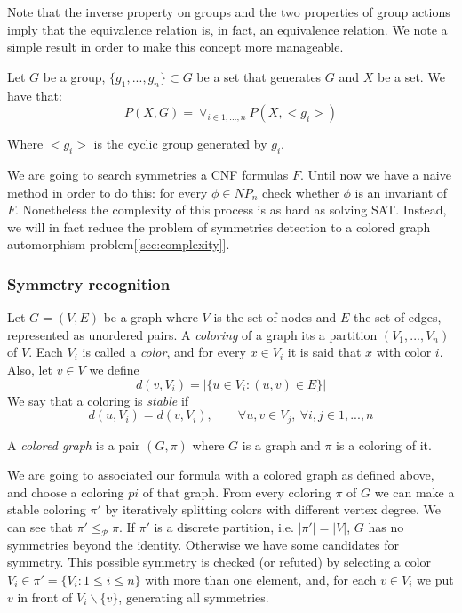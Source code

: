 Note that the inverse property on groups and the two properties of group actions imply that the equivalence relation is, in fact, an equivalence relation. We note a simple result in order to make this concept more manageable.

\begin{proposition}
  Let $G$ be a group, $\{g_1,...,g_n\}\subset G$ be a set that generates $G$ and $X$ be a set. We have that:
  $$P(X,G) = \lor_{i\in 1,...,n} P(X,<g_i>) $$

  Where $<g_i>$ is the cyclic group generated by $g_i$.
\end{proposition}


We are going to search symmetries a CNF formulas $F$. Until now we have a naive method in order to do this: for every $\phi \in NP_n$ check whether $\phi$ is an invariant of $F$. Nonetheless the complexity of this process is as hard as solving SAT. Instead, we will in fact reduce the problem of symmetries detection to a colored graph  automorphism problem[\ref{sec:complexity}].\\




\subsubsection{Symmetry recognition}



\begin{definition}
  Let $G = (V,E)$ be a graph where $V$ is the set of nodes and $E$ the set of edges, represented as unordered pairs. A \emph{coloring} of a graph its a partition  $(V_1,...,V_n)$ of $V$. Each  $V_i$ is called a \emph{color}, and for every $x\in V_i$ it is said that $x$ with color $i$. Also, let $v\in V$ we define $$d(v, V_i) = |\{u \in V_i : (u,v)\in E\}|$$
  We say that a coloring is \emph{stable} if
  $$d(u,V_i) = d(v,V_i), \qquad  \forall u,v \in V_j,\ \forall i,j \in 1,...,n$$

  A \emph{colored graph} is a pair $(G,\pi)$ where $G$ is a graph and $\pi$ is a coloring of it.
\end{definition}


We are going to associated our formula with a colored graph as defined above, and choose a coloring $pi$ of that graph. From every coloring $\pi$ of $G$ we can make a stable coloring $\pi'$ by iteratively splitting colors with different vertex degree. We can see that $\pi' \le_\mathcal{P} \pi$. If $\pi'$ is a discrete partition, i.e. $|\pi'| = |V|$,  $G$ has no symmetries beyond the identity. Otherwise we have some candidates for symmetry. This possible symmetry is checked (or refuted) by selecting a color $V_i\in \pi' = \{V_i : 1 \le i \le n\}$ with more than one element, and, for each $v\in V_i$ we put $v$ in front of $V_i \backslash \{v\}$, generating all symmetries.

